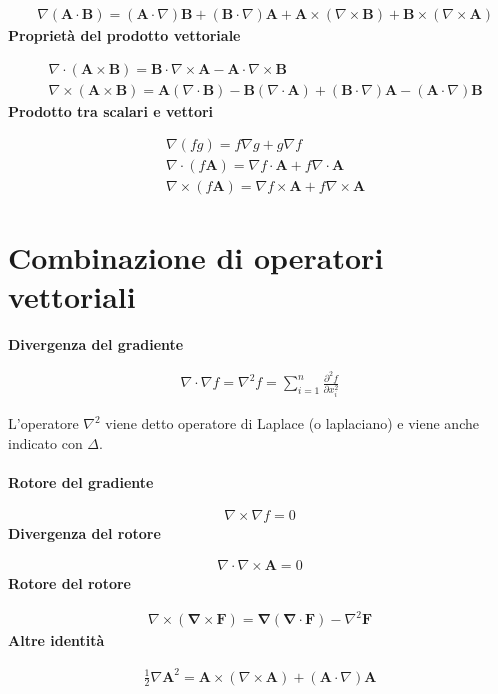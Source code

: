 \begin{align*}
	&\nabla(\mathbf{A} \cdot \mathbf{B}) = (\mathbf{A} \cdot \nabla)\mathbf{B} + (\mathbf{B} \cdot \nabla)\mathbf{A} + \mathbf{A} \times (\nabla \times \mathbf{B}) + \mathbf{B} \times (\nabla \times \mathbf{A})
\end{align*}
\textbf{Proprietà del prodotto vettoriale}

\begin{align*}
	&\nabla \cdot (\mathbf{A} \times \mathbf{B}) = \mathbf{B} \cdot \nabla \times \mathbf{A} - \mathbf{A} \cdot \nabla \times \mathbf{B} \\
	&\nabla \times (\mathbf{A} \times \mathbf{B}) = \mathbf{A} (\nabla \cdot \mathbf{B}) -\mathbf{B}  (\nabla \cdot \mathbf{A})+( \mathbf{B}\cdot \nabla)\mathbf{A}-( \mathbf{A}\cdot \nabla)\mathbf{B}
\end{align*}
\textbf{Prodotto tra scalari e vettori}

\begin{align*}
	&\nabla (fg) = f \nabla g + g \nabla f \\
	&\nabla \cdot (f\mathbf{A}) = \nabla f \cdot \mathbf{A} + f \nabla \cdot \mathbf{A}\\
	&\nabla \times (f \mathbf{A}) = \nabla f \times \mathbf{A} + f \nabla \times \mathbf{A}
\end{align*}

\section{Combinazione di operatori vettoriali}

\textbf{Divergenza del gradiente}

\begin{align*}
	\nabla \cdot \nabla f = \nabla^2 f   = \sum_{i=1}^n \frac {\partial^2f}{\partial x^2_i}
\end{align*}

L'operatore $ \nabla^2$ viene detto operatore di Laplace (o laplaciano) e viene anche indicato con $ \Delta $. \\\\
\textbf{Rotore del gradiente}

\begin{align*}
	\nabla \times \nabla f = 0
\end{align*}
\textbf{Divergenza del rotore}

\begin{align*}
	\nabla \cdot \nabla \times \mathbf{A} = 0
\end{align*}
\textbf{Rotore del rotore}

\begin{align*}
	\nabla \times \left( \mathbf{\nabla \times F} \right) = \mathbf{\nabla} (\mathbf{\nabla \cdot F}) - \nabla^2 \mathbf{F}
\end{align*}
\textbf{Altre identità}

\begin{align*}
	\frac{1}{2} \nabla \mathbf{A}^2 = \mathbf{A} \times (\nabla \times \mathbf{A}) + (\mathbf{A} \cdot \nabla) \mathbf{A}
\end{align*}